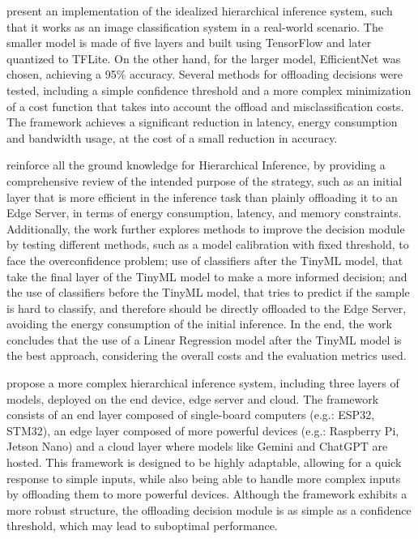 \begin{description}[style=unboxed, leftmargin=1cm, font=\bfseries]

    \item [\textcite{al-atat_case_2023}]
    present an implementation of the idealized hierarchical inference system, such
    that it works as an image classification system in a real-world scenario. The
    smaller model is made of five layers and built using TensorFlow and later 
    quantized to TFLite. On the other hand, for the larger model, EfficientNet was
    chosen, achieving a 95\% accuracy. Several methods for offloading decisions were
    tested, including a simple confidence threshold and a more complex minimization 
    of a cost function that takes into account the offload and misclassification costs.  
    The framework achieves a significant
    reduction in latency, energy consumption and bandwidth usage, at the cost of a 
    small reduction in accuracy.


    
    \item [\textcite{behera_improved_2023}]
    reinforce all the ground knowledge for Hierarchical Inference, by providing
    a comprehensive review of the intended purpose of the strategy, such as an initial
    layer that is more efficient in the inference task than plainly offloading it to
    an Edge Server, in terms of energy consumption, latency, and memory constraints.
    Additionally, the work further explores methods to improve the decision module by 
    testing different methods, such as a model calibration with fixed threshold, to
    face the overconfidence problem; use of classifiers after the TinyML model, that
    take the final layer of the TinyML model to make a more informed decision; and the
    use of classifiers before the TinyML model, that tries to predict if the sample is
    hard to classify, and therefore should be directly offloaded to the Edge Server,
    avoiding the energy consumption of the initial inference. In the end, the work
    concludes that the use of a Linear Regression model after the TinyML model is the
    best approach, considering the overall costs and the evaluation metrics used.

    
    \item[\textcite{e_m_k_adaptive_2025}] 
    propose a more complex hierarchical inference system, including
    three layers of models, deployed on the end device, edge server and cloud. The
    framework consists of an end layer composed of single-board computers (e.g.:
    ESP32, STM32), an edge layer composed of more powerful devices (e.g.: Raspberry Pi,
    Jetson Nano) and a cloud layer where models like Gemini and ChatGPT are hosted.
    This framework is designed to be highly adaptable, allowing for a quick response
    to simple inputs, while also being able to handle more complex inputs by offloading
    them to more powerful devices. Although the framework exhibits a more robust
    structure, the offloading decision module is as simple as a confidence threshold,
    which may lead to suboptimal performance. 

\end{description}


